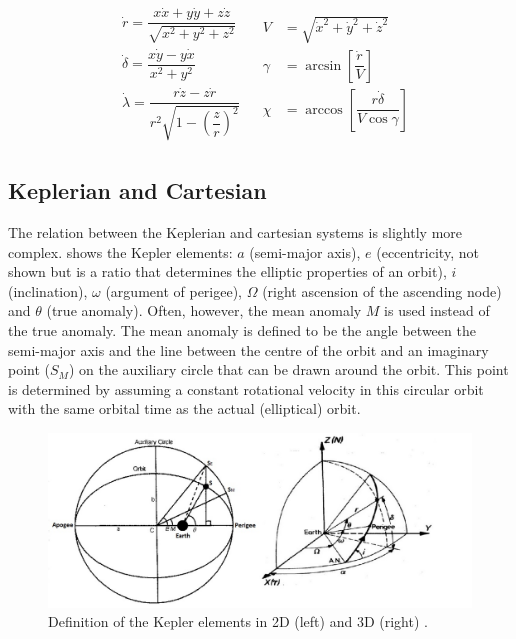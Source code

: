 \begin{align} \label{eq:carttospherv}
\begin{split}
& \dot{r}=\dfrac{x\dot{x}+y\dot{y}+z\dot{z}}{\sqrt{x^{2}+y^{2}+z^{2}}}\\
& \dot{\delta}=\dfrac{x\dot{y}-y\dot{x}}{x^{2}+y^{2}}\\
& \dot{\lambda}=\dfrac{r\dot{z}-z\dot{r}}{r^{2}\sqrt{1-\left(\dfrac{z}{r}\right)^{2}}}
\end{split}
&
\begin{split}
V&=\sqrt{\dot{x}^{2}+\dot{y}^{2}+\dot{z}^{2}}\\
\gamma&=\arcsin\left[\dfrac{\dot{r}}{V}\right]\\
\chi&=\arccos\left[\dfrac{r \dot{\delta}}{V\cos\gamma }\right]
\end{split}
\end{align}


\subsection{Keplerian and Cartesian}
\label{subsec:keplcart}
The relation between the Keplerian and cartesian systems is slightly more complex.  shows the Kepler elements: $a$ (semi-major axis), $e$ (eccentricity, not shown but is a ratio that determines the elliptic properties of an orbit), $i$ (inclination), $\omega$ (argument of perigee), $\Omega$ (right ascension of the ascending node) and $\theta$ (true anomaly). Often, however, the mean anomaly $M$ is used instead of the true anomaly. The mean anomaly is defined to be the angle between the semi-major axis and the line between the centre of the orbit and an imaginary point ($S_{M}$) on the auxiliary circle that can be drawn around the orbit. This point is determined by assuming a constant rotational velocity in this circular orbit with the same orbital time as the actual (elliptical) orbit. 



\begin{figure}[!ht]
\centering
\includegraphics[width=1.0\textwidth]{figures/reference_frames/kepler_noomen2013basic_akcasu2013.jpg}
\caption{Definition of the Kepler elements in 2D (left) and 3D (right) \citep{noomen2013basic,akcasu2013}.}
\label{fig:kepler_noomen2013basic_akcasu2013_1}
\end{figure}


